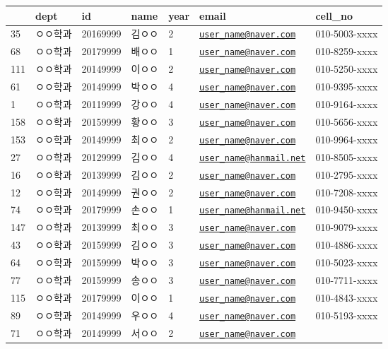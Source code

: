 \documentclass[]{article}
\begin{document}
\begin{longtable}[]{@{}lllllll@{}}
\toprule
& dept & id & name & year & email & cell\_no\tabularnewline
\midrule
\endhead
35 & ㅇㅇ학과 & 20169999 & 김ㅇㅇ & 2 &
\href{mailto:user_name@naver.com}{\nolinkurl{user\_name@naver.com}} &
010-5003-xxxx\tabularnewline
68 & ㅇㅇ학과 & 20179999 & 배ㅇㅇ & 1 &
\href{mailto:user_name@naver.com}{\nolinkurl{user\_name@naver.com}} &
010-8259-xxxx\tabularnewline
111 & ㅇㅇ학과 & 20149999 & 이ㅇㅇ & 2 &
\href{mailto:user_name@naver.com}{\nolinkurl{user\_name@naver.com}} &
010-5250-xxxx\tabularnewline
61 & ㅇㅇ학과 & 20149999 & 박ㅇㅇ & 4 &
\href{mailto:user_name@naver.com}{\nolinkurl{user\_name@naver.com}} &
010-9395-xxxx\tabularnewline
1 & ㅇㅇ학과 & 20119999 & 강ㅇㅇ & 4 &
\href{mailto:user_name@naver.com}{\nolinkurl{user\_name@naver.com}} &
010-9164-xxxx\tabularnewline
158 & ㅇㅇ학과 & 20159999 & 황ㅇㅇ & 3 &
\href{mailto:user_name@naver.com}{\nolinkurl{user\_name@naver.com}} &
010-5656-xxxx\tabularnewline
153 & ㅇㅇ학과 & 20149999 & 최ㅇㅇ & 2 &
\href{mailto:user_name@naver.com}{\nolinkurl{user\_name@naver.com}} &
010-9964-xxxx\tabularnewline
27 & ㅇㅇ학과 & 20129999 & 김ㅇㅇ & 4 &
\href{mailto:user_name@hanmail.net}{\nolinkurl{user\_name@hanmail.net}}
& 010-8505-xxxx\tabularnewline
16 & ㅇㅇ학과 & 20139999 & 김ㅇㅇ & 2 &
\href{mailto:user_name@naver.com}{\nolinkurl{user\_name@naver.com}} &
010-2795-xxxx\tabularnewline
12 & ㅇㅇ학과 & 20149999 & 권ㅇㅇ & 2 &
\href{mailto:user_name@naver.com}{\nolinkurl{user\_name@naver.com}} &
010-7208-xxxx\tabularnewline
74 & ㅇㅇ학과 & 20179999 & 손ㅇㅇ & 1 &
\href{mailto:user_name@hanmail.net}{\nolinkurl{user\_name@hanmail.net}}
& 010-9450-xxxx\tabularnewline
147 & ㅇㅇ학과 & 20139999 & 최ㅇㅇ & 3 &
\href{mailto:user_name@naver.com}{\nolinkurl{user\_name@naver.com}} &
010-9079-xxxx\tabularnewline
43 & ㅇㅇ학과 & 20159999 & 김ㅇㅇ & 3 &
\href{mailto:user_name@naver.com}{\nolinkurl{user\_name@naver.com}} &
010-4886-xxxx\tabularnewline
64 & ㅇㅇ학과 & 20159999 & 박ㅇㅇ & 3 &
\href{mailto:user_name@naver.com}{\nolinkurl{user\_name@naver.com}} &
010-5023-xxxx\tabularnewline
77 & ㅇㅇ학과 & 20159999 & 송ㅇㅇ & 3 &
\href{mailto:user_name@naver.com}{\nolinkurl{user\_name@naver.com}} &
010-7711-xxxx\tabularnewline
115 & ㅇㅇ학과 & 20179999 & 이ㅇㅇ & 1 &
\href{mailto:user_name@naver.com}{\nolinkurl{user\_name@naver.com}} &
010-4843-xxxx\tabularnewline
89 & ㅇㅇ학과 & 20149999 & 우ㅇㅇ & 4 &
\href{mailto:user_name@naver.com}{\nolinkurl{user\_name@naver.com}} &
010-5193-xxxx\tabularnewline
71 & ㅇㅇ학과 & 20149999 & 서ㅇㅇ & 2 &
\href{mailto:user_name@naver.com}{\nolinkurl{user\_name@naver.com}} &

\end{longtable}
\end{document}
